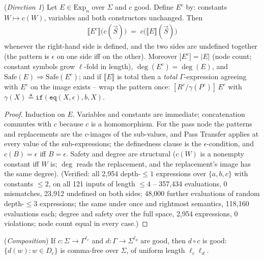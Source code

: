 \begin{theorem}
    (\emph{Direction 1})
    \label{thm:transfer-forward}
    Let $E \in \mathrm{Exp}_n$ over $\Sigma$ and $c$ good. Define $E^c$ by:
    constants $W \mapsto c(W)$, variables and both constructors unchanged.
    Then
    \begin{align}
        \llbracket E^c \rrbracket\big(c(\vec S)\big) \;=\;
        c\big(\llbracket E \rrbracket(\vec S)\big)
    \end{align}
    whenever the right-hand side is defined, and the two sides are
    undefined together (the pattern is $\epsilon$ on one side iff on the
    other). Moreover $|E^c| = |E|$ (node count; constant symbols grow
    $\ell$-fold in length), $\deg(E^c) = \deg(E)$, and
    $\mathrm{Safe}(E) \Rightarrow \mathrm{Safe}(E^c)$; and if $\llbracket E
    \rrbracket$ is total then a \emph{total} $\Gamma$-expression agreeing
    with $E^c$ on the image exists -- wrap the pattern once:
    $[R^c/\gamma(P^c)]\,E^c$ with $\gamma(X) \triangleq
    \mathtt{if}(\mathtt{eq}(X,\epsilon), b, X)$.
\end{theorem}

\begin{proof}
    Induction on $E$. Variables and constants are immediate; concatenation
    commutes with $c$ because $c$ is a homomorphism. For the pass node the
    patterns and replacements are the $c$-images of the sub-values, and
    Pass Transfer applies at every value of the sub-expressions; the
    definedness clause is the $\epsilon$-condition, and $c(B) = \epsilon$
    iff $B = \epsilon$. Safety and degree are structural ($c(W)$ is a
    nonempty constant iff $W$ is; $\deg$ reads the replacement, and the
    replacement's image has the same degree). (Verified: all 2,954
    depth-$\le 1$ expressions over $\{a,b,c\}$ with constants $\le 2$, on
    all 121 inputs of length $\le 4$ -- 357,434 evaluations, 0 mismatches,
    23,912 undefined on both sides; 48,000 further evaluations of random
    depth-$\le 3$ expressions; the same under once and rightmost semantics,
    118,160 evaluations each; degree and safety over the full space, 2,954
    expressions, 0 violations; node count equal in every case.)
\end{proof}

\begin{lemma}
    (\emph{Composition})
    \label{lem:compose}
    If $c : \Sigma \rightarrow \Gamma^{\ell_c}$ and $d : \Gamma \rightarrow
    \Sigma^{\ell_d}$ are good, then $d \circ c$ is good: $\{d(w) : w \in
    D_c\}$ is comma-free over $\Sigma$, of uniform length
    $\ell_c\ell_d$.
\end{lemma}

